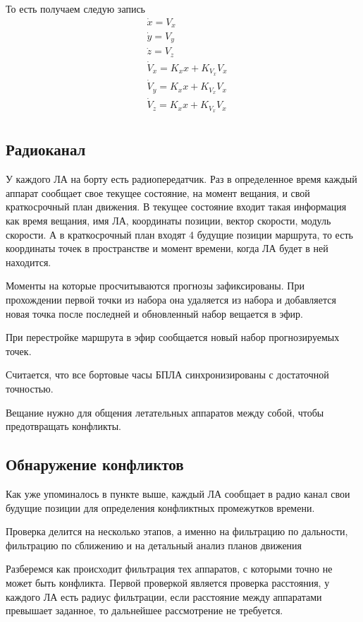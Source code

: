 \documentclass[a4paper,12pt]{article}
\newcounter{def}
\def\thefigure{\thesubsubsection.\arabic{figure}}
\numberwithin{figure}{subsubsection}
\begin{document}
То есть получаем следую запись
\begin{align*}
    &\dot{x} = V_x\\
    &\dot{y} = V_y\\
    &\dot{z} = V_z\\
    &\dot{V}_x = K_x x + K_{V_x} V_x\\
    &\dot{V}_y = K_x x + K_{V_x} V_x\\
    &\dot{V}_z = K_x x + K_{V_x} V_x\\
\end{align*}



\subsection{Радиоканал}
У каждого ЛА на борту есть радиопередатчик. Раз в определенное время каждый аппарат сообщает свое текущее состояние, на момент вещания, и свой краткосрочный план движения. В текущее состояние входит такая информация как время вещания, имя ЛА, координаты позиции, вектор скорости, модуль скорости. А в краткосрочный план входят 4 будущие позиции маршрута, то есть координаты точек в пространстве и момент времени, когда ЛА будет в ней находится. 

Моменты на которые просчитываются прогнозы зафиксированы. При прохождении первой точки из набора она удаляется из набора и добавляется новая точка после последней и обновленный набор вещается в эфир.

При перестройке маршрута в эфир сообщается новый набор прогнозируемых точек.

Считается, что все бортовые часы БПЛА синхронизированы с достаточной точностью.

Вещание нужно для общения летательных аппаратов между собой, чтобы предотвращать конфликты.

\subsection{Обнаружение конфликтов}
\def\thefigure{\thesubsection.\arabic{figure}}
Как уже упоминалось в пункте выше, каждый ЛА сообщает в радио канал свои будущие позиции для определения конфликтных промежутков времени.

Проверка делится на несколько этапов, а именно на фильтрацию по дальности, фильтрацию по сближению и на детальный анализ планов движения

Разберемся как происходит фильтрация тех аппаратов, с которыми точно не может быть конфликта. 
Первой проверкой является проверка расстояния, у каждого ЛА есть радиус фильтрации, если расстояние между аппаратами превышает заданное, то дальнейшее рассмотрение не требуется. 
\end{document}
